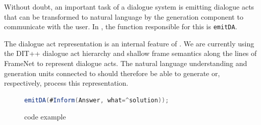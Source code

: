 Without doubt, an important task of a dialogue system is emitting dialogue acts that can be transformed to natural language by the generation component to communicate with the user. In \vonda, the function responsible for this is \texttt{emitDA}.

The dialogue act representation is an internal feature of \vonda. We are currently using the DIT++ dialogue act hierarchy \citep{bunt2012iso} and shallow frame semantics along the lines of FrameNet \citep{ruppenhofer2016framenet} to represent dialogue acts. The natural language understanding and generation units connected to \vonda should therefore be able to generate or, respectively, process this representation.

\begin{figure}[htb]
  \centering\small%
\begin{lstlisting}[language=Java]
emitDA(#Inform(Answer, what=^solution));
\end{lstlisting}\vspace*{-3ex}
  \caption{\vonda code example}
  \label{fig:DA}
\end{figure}



